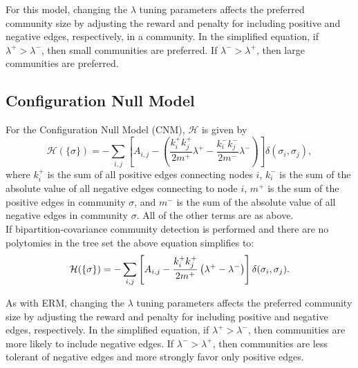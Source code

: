\documentclass[11pt]{article}
\begin{document}
For this model, changing the $\lambda$ tuning parameters affects the preferred community size by
adjusting the reward and penalty for including positive and negative edges, respectively, in a
community. In the simplified equation, if $\lambda^{+} > \lambda^{-}$, then small communities are preferred. If $\lambda^{-} > \lambda^{+}$, then large communities are preferred. \\


\subsection{Configuration Null Model}\label{appendix:CNModel}

For the Configuration Null Model (CNM), $\mathcal{H}$ is given by
\begin{equation}\label{eq:CNModel1}
\mathcal{H}(\{\sigma\}) = - \displaystyle\sum_{i,j} \left[A_{i,j} -  \left(\frac{k_{i}^{+} k_{j}^{+}}{2m^{+}} \lambda^{+} - \frac{k_{i}^{-} k_{j}^{-}}{2m^{-}} \lambda^{-}\right)\right]\delta(\sigma_{i}, \sigma_{j}),
\end{equation}
where $k_{i}^{+}$ is the sum of all positive edges connecting nodes $i$, $k_{i}^{-}$ is the sum of the absolute value of all negative edges connecting to node $i$, $m^{+}$ is the sum of the positive edges in community $\sigma$, and $m^{-}$ is the sum of the absolute value of all negative edges in community $\sigma$. All of the other terms are as above. \\


If bipartition-covariance community detection is performed and there are no polytomies in
the tree set the above equation simplifies to:
\begin{equation}\label{eq:CNModel2}
\mathcal{H}(\{\sigma\}) = - \displaystyle\sum_{i,j} \left[A_{i,j} -  \frac{k_{i}^{+} k_{j}^{+}}{2m^{+}} \left(\lambda^{+} - \lambda^{-}\right)\right]\delta(\sigma_{i}, \sigma_{j}). \\
\end{equation}


As with ERM, changing the $\lambda$ tuning parameters affects the preferred community size by
adjusting the reward and penalty for including positive and negative edges, respectively. In
the simplified equation, if $\lambda^{+} > \lambda^{-}$, then communities are more likely to include negative edges. If $\lambda^{-} > \lambda^{+}$, then communities are less tolerant of negative edges and more strongly favor only positive edges. \\
\end{document}
